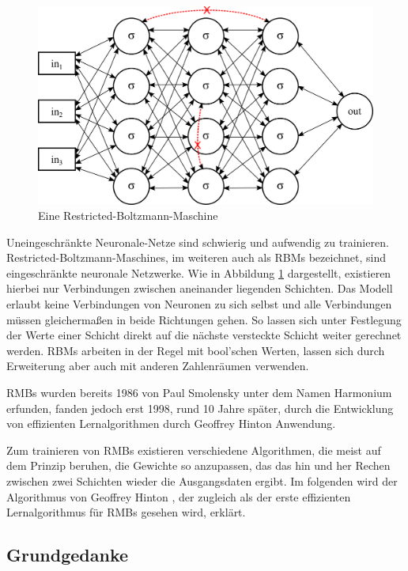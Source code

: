 \begin{figure}
	\centering
	\includegraphics[scale=1]{images/rbm.png}
	\caption{Eine Restricted-Boltzmann-Maschine}
	\label{fig:rbm}
\end{figure}

Uneingeschränkte Neuronale-Netze sind schwierig und aufwendig zu trainieren. Restricted-Boltzmann-Maschines, im weiteren auch als RBMs bezeichnet, sind eingeschränkte neuronale Netzwerke. Wie in Abbildung \ref{fig:rbm} dargestellt, existieren hierbei nur Verbindungen zwischen aneinander liegenden Schichten. Das Modell erlaubt keine Verbindungen von Neuronen zu sich selbst und alle Verbindungen müssen gleichermaßen in beide Richtungen gehen. So lassen sich unter Festlegung der Werte einer Schicht direkt auf die nächste versteckte Schicht weiter gerechnet werden. RBMs arbeiten in der Regel mit bool'schen Werten, lassen sich durch Erweiterung aber auch mit anderen Zahlenräumen verwenden.

RMBs wurden bereits 1986 von Paul Smolensky  unter dem Namen Harmonium erfunden, fanden jedoch erst 1998, rund 10 Jahre später, durch die Entwicklung von effizienten Lernalgorithmen durch Geoffrey Hinton Anwendung.

Zum trainieren von RMBs existieren verschiedene Algorithmen, die meist auf dem Prinzip beruhen, die Gewichte so anzupassen, das das hin und her Rechen zwischen zwei Schichten wieder die Ausgangsdaten ergibt. Im folgenden wird der Algorithmus von Geoffrey Hinton , der zugleich als der erste effizienten Lernalgorithmus für RMBs gesehen wird, erklärt. 

\subsection{Grundgedanke}


